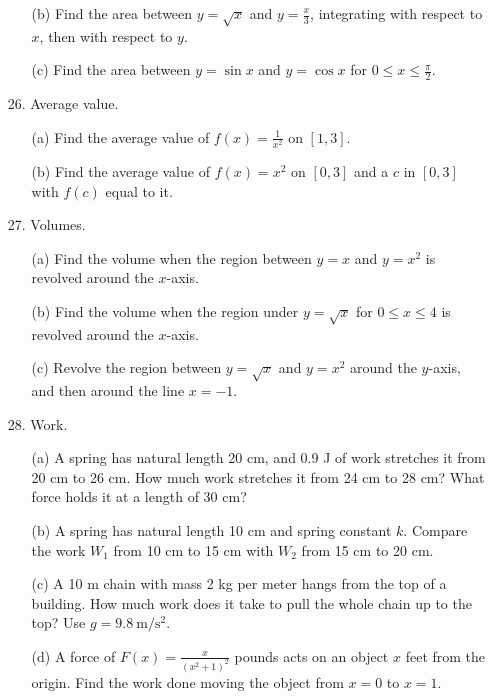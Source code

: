 \documentclass[12pt]{article}
\begin{document}
\begin{enumerate}
\begin{enumerate}
\begin{center}
\end{center}
\item[(b)] Find the area between $y = \sqrt{x}$ and $y = \frac{x}{3}$, integrating with respect to $x$, then with respect to $y$.
\item[(c)] Find the area between $y = \sin x$ and $y = \cos x$ for $0 \leq x \leq \frac{\pi}{2}$.
\end{enumerate}
\item[26.] Average value.
\begin{enumerate}
\item[(a)] Find the average value of $f(x) = \frac{1}{x^2}$ on $[1,3]$.
\item[(b)] Find the average value of $f(x) = x^2$ on $[0,3]$ and a $c$ in $[0,3]$ with $f(c)$ equal to it.
\end{enumerate}
\item[27.] Volumes.
\begin{enumerate}
\item[(a)] Find the volume when the region between $y = x$ and $y = x^2$ is revolved around the $x$-axis.
\item[(b)] Find the volume when the region under $y = \sqrt{x}$ for $0 \leq x \leq 4$ is revolved around the $x$-axis.
\item[(c)] Revolve the region between $y = \sqrt{x}$ and $y = x^2$ around the $y$-axis, and then around the line $x = -1$.
\end{enumerate}
\item[28.] Work.
\begin{enumerate}
\item[(a)] A spring has natural length 20 cm, and 0.9 J of work stretches it from 20 cm to 26 cm. How much work stretches it from 24 cm to 28 cm? What force holds it at a length of 30 cm?
\item[(b)] A spring has natural length 10 cm and spring constant $k$. Compare the work $W_1$ from 10 cm to 15 cm with $W_2$ from 15 cm to 20 cm.
\item[(c)] A 10 m chain with mass 2 kg per meter hangs from the top of a building. How much work does it take to pull the whole chain up to the top? Use $g = 9.8\ \text{m}/\text{s}^2$.
\item[(d)] A force of $F(x) = \frac{x}{(x^2+1)^2}$ pounds acts on an object $x$ feet from the origin. Find the work done moving the object from $x=0$ to $x=1$.
\end{enumerate}
\end{enumerate}
\end{document}
